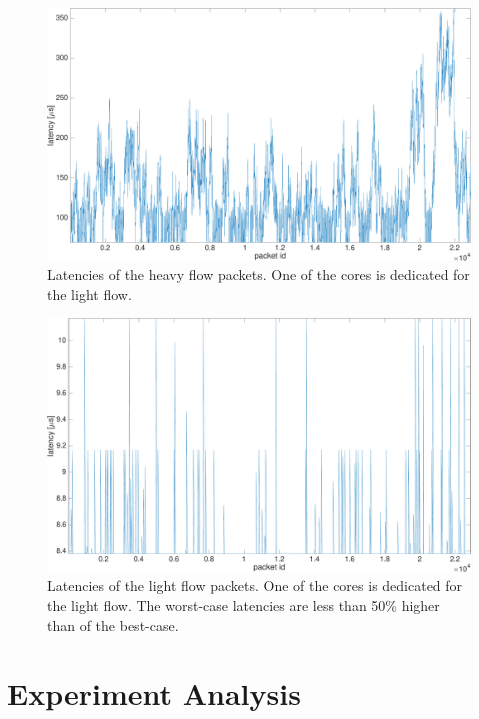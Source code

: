 \begin{figure}[]
  \begin{center}
    \includegraphics[width=\textwidth]{images/experiment/exp2-app1-is-coremask-latency.pdf}
    \caption{Latencies of the heavy flow packets. One of the cores is dedicated for the light flow.}
    \label{fig:exp2-app1-is-coremask-latency}
  \end{center}
\end{figure}

\begin{figure}[]
  \begin{center}
    \includegraphics[width=\textwidth]{images/experiment/exp2-app2-is-coremask-latency.pdf}
    \caption{Latencies of the light flow packets. One of the cores is dedicated for the light flow. The worst-case latencies are less than 50\% higher than of the best-case.}
    \label{fig:exp2-app2-is-coremask-latency}
  \end{center}
\end{figure}

\section{Experiment Analysis}


